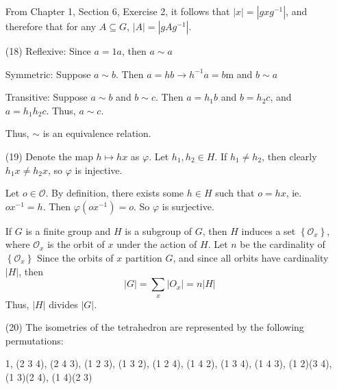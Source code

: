 \documentclass[12pt]{article}
\begin{document}
\begin{itemize}
From Chapter 1, Section 6, Exercise 2, it follows that $|x| = |gxg^{-1}|$, and therefore that for any $A \subseteq G$, $|A| = |gAg^{-1}|$.
\item[(18)]
Reflexive: Since $a = 1a$, then $a \sim a$

Symmetric: Suppose $a \sim b$. Then $a = hb \rightarrow h^{-1}a = b$m and $b \sim a$ 

Transitive: Suppose $a \sim b$ and $b \sim c$. Then $a = h_1b$ and $b = h_2c$, and $a = h_1h_2c$. Thus, $a \sim c$.

Thus, $\sim$ is an equivalence relation.
\item[(19)]
Denote the map $h \mapsto hx$ as $\varphi$. Let $h_1, h_2 \in H$. If $h_1 \neq h_2$, then clearly $h_1x \neq h_2x$, so $\varphi$ is injective.

Let $o \in \mathcal{O}$. By definition, there exists some $h \in H$ such that $o = hx$, ie. $ox^{-1} = h$. Then $\varphi(ox^{-1}) = o$. So $\varphi$ is surjective.

If $G$ is a finite group and $H$ is a subgroup of $G$, then $H$ induces a set $\left\lbrace \mathcal{O}_x \right\rbrace$, where $\mathcal{O}_x$ is the orbit of $x$ under the action of $H$. Let $n$ be the cardinality of $\left\lbrace \mathcal{O}_x \right\rbrace$ Since the orbits of $x$ partition $G$, and since all orbits have cardinality $|H|$, then
$$|G| = \sum_x |O_x| = n|H|$$
Thus, $|H|$ divides $|G|$.
\item[(20)]
The isometries of the tetrahedron are represented by the following permutations:

1, (2 3 4), (2 4 3), (1 2 3), (1 3 2), (1 2 4), (1 4 2), (1 3 4), (1 4 3), (1 2)(3 4), (1 3)(2 4), (1 4)(2 3)


\end{itemize}
\end{document}
